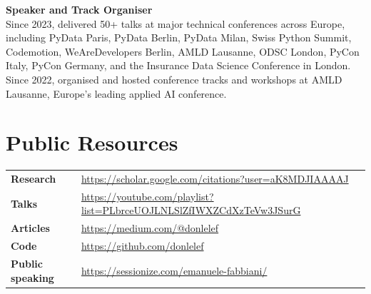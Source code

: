 \documentclass[10pt,a4paper]{article}
\begin{document}
\vspace{3pt}
\textbf{Speaker and Track Organiser}\\
Since 2023, delivered 50+ talks at major technical conferences across Europe, including PyData Paris, PyData Berlin, PyData Milan, Swiss Python Summit, Codemotion, WeAreDevelopers Berlin, AMLD Lausanne, ODSC London, PyCon Italy, PyCon Germany, and the Insurance Data Science Conference in London. Since 2022, organised and hosted conference tracks and workshops at AMLD Lausanne, Europe's leading applied AI conference.

\section*{Public Resources}
\begin{tabularx}{\textwidth}{>{\bfseries}p{2.7cm}X}
Research & \url{https://scholar.google.com/citations?user=aK8MDJIAAAAJ}\\
Talks & \url{https://youtube.com/playlist?list=PLbrceUOJLNLSlZfIWXZCdXzTeVw3JSurG}\\
Articles & \url{https://medium.com/@donlelef}\\
Code & \url{https://github.com/donlelef}\\
Public speaking & \url{https://sessionize.com/emanuele-fabbiani/}
\end{tabularx}
\end{document}

